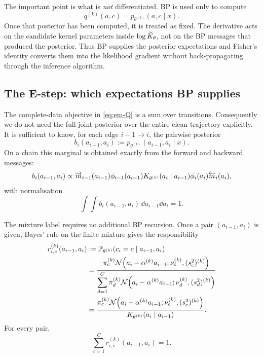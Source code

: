 The important point is what is \emph{not} differentiated. BP is used only to
compute
\[
  q^{(k)}(a,c)
  =
  p_{\theta^{(k)}}(a,c\mid x).
\]
Once that posterior has been computed, it is treated as fixed. The derivative
acts on the candidate kernel parameters inside
$\log\widetilde{K}_\theta$, not on the BP messages that produced the
posterior. Thus BP supplies the posterior expectations and Fisher's identity
converts them into the likelihood gradient without back-propagating through
the inference algorithm.

\subsection{The E-step: which expectations BP supplies}

The complete-data objective in \eqref{eq:em-Q} is a sum over transitions.
Consequently we do not need the full joint posterior over the entire clean
trajectory explicitly. It is sufficient to know, for each edge
$i-1\to i$, the pairwise posterior
\begin{equation}
  b_i(a_{i-1},a_i)
  :=
  p_{\theta^{(k)}}(a_{i-1},a_i\mid x).
  \label{eq:em-pairwise-def}
\end{equation}
On a chain this marginal is obtained exactly from the forward and backward
messages:
\begin{equation}
  b_i(a_{i-1},a_i)
  \propto
  \overrightarrow{m}_{i-1}(a_{i-1})
  \phi_{i-1}(a_{i-1})
  K_{\theta^{(k)}}(a_i\mid a_{i-1})
  \phi_i(a_i)
  \overleftarrow{m}_i(a_i),
  \label{eq:em-pairwise}
\end{equation}
with normalisation
\begin{equation}
  \int\!\!\int
  b_i(a_{i-1},a_i)
  \,\dd a_{i-1}\dd a_i
  =1.
\end{equation}

The mixture label requires no additional BP recursion. Once a pair
$(a_{i-1},a_i)$ is given, Bayes' rule on the finite mixture gives the
responsibility
\begin{align}
  r_{i,c}^{(k)}(a_{i-1},a_i)
  &:=
  \mathbb{P}_{\theta^{(k)}}\!
  \left(
    c_i=c
    \mid
    a_{i-1},a_i
  \right)
  \nonumber\\
  &=
  \frac{
    \pi_c^{(k)}
    \mathcal{N}\!\left(
      a_i-\alpha^{(k)}a_{i-1};
      \nu_c^{(k)},(s_c^2)^{(k)}
    \right)
  }{
    \displaystyle
    \sum_{d=1}^{C}
    \pi_d^{(k)}
    \mathcal{N}\!\left(
      a_i-\alpha^{(k)}a_{i-1};
      \nu_d^{(k)},(s_d^2)^{(k)}
    \right)
  }
  \nonumber\\
  &=
  \frac{
    \pi_c^{(k)}
    \mathcal{N}\!\left(
      a_i-\alpha^{(k)}a_{i-1};
      \nu_c^{(k)},(s_c^2)^{(k)}
    \right)
  }{
    K_{\theta^{(k)}}(a_i\mid a_{i-1})
  }.
  \label{eq:em-responsibility}
\end{align}
For every pair,
\begin{equation}
  \sum_{c=1}^{C}
  r_{i,c}^{(k)}(a_{i-1},a_i)
  =1.
\end{equation}

